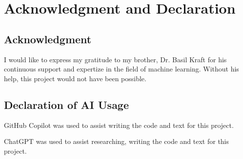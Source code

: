 


\section{Acknowledgment and Declaration}
\label{acknowledgment_declaration}

\subsection{Acknowledgment}%

I would like to express my gratitude to my brother, Dr. Basil Kraft for his continuous
support and expertize in the field of machine learning. Without his help, this project would not 
have been possible.

\subsection{Declaration of AI Usage}%

GitHub Copilot was used to assist writing the code and text for this project.

ChatGPT was used to assist researching, writing the code and text for this project.

\newpage
{}


